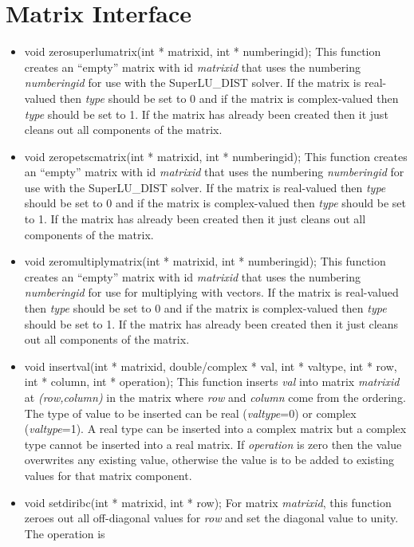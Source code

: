 \section{Matrix Interface}
\begin{itemize}
\item  void zerosuperlumatrix(int * matrixid, int * numberingid);  This function creates
an ``empty'' matrix with id \textit{matrixid} that uses the numbering \textit{numberingid}
for use with the SuperLU\_DIST solver.  If the matrix is real-valued then \textit{type}
should be set to 0 and if the matrix is complex-valued then \textit{type} should be set to 1. 
If the matrix has already been created then it just cleans out all components of the matrix.
\item  void zeropetscmatrix(int * matrixid, int * numberingid); This function creates
an ``empty'' matrix with id \textit{matrixid} that uses the numbering \textit{numberingid}
for use with the SuperLU\_DIST solver.  If the matrix is real-valued then \textit{type}
should be set to 0 and if the matrix is complex-valued then \textit{type} should be set to 1. 
If the matrix has already been created then it just cleans out all components of the matrix.
 \item void zeromultiplymatrix(int * matrixid, int * numberingid); This function creates
an ``empty'' matrix with id \textit{matrixid} that uses the numbering \textit{numberingid}
for use for multiplying with vectors.  If the matrix is real-valued then \textit{type}
should be set to 0 and if the matrix is complex-valued then \textit{type} should be set to 1. 
If the matrix has already been created then it just cleans out all components of the matrix.
\item  void insertval(int * matrixid, double/complex * val, int * valtype, int * row, 
		   int * column, int * operation);  This function inserts \textit{val} into
matrix \textit{matrixid} at \textit{(row,column)} in the matrix where \textit{row}
and \textit{column} come from the ordering.  The type of value to
 be inserted can be real (\textit{valtype}=0)
or complex (\textit{valtype}=1).  A real type can be inserted into a complex matrix but
a complex type cannot be inserted into a real matrix.  If \textit{operation}
is zero then the value overwrites any existing value, otherwise the value is to be added
to existing values for that matrix component.
\item  void setdiribc(int * matrixid, int * row);  For matrix \textit{matrixid}, this function
zeroes out all off-diagonal values for \textit{row} and set the diagonal value to unity.  The operation is

\end{itemize}
